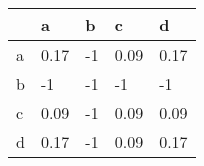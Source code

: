 \begin{tabular}{lllll}
\toprule
{} &     a &  b &     c &     d \\
\midrule
a &  0.17 & -1 &  0.09 &  0.17 \\
b &    -1 & -1 &    -1 &    -1 \\
c &  0.09 & -1 &  0.09 &  0.09 \\
d &  0.17 & -1 &  0.09 &  0.17 \\
\bottomrule
\end{tabular}
